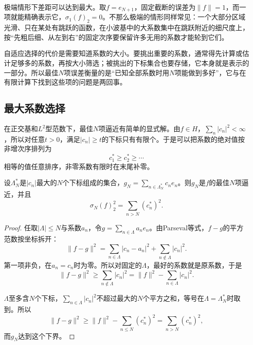 极端情形下差距可以达到最大。取$f=e_{N+1}$，固定截断的误差为$\lVert f\rVert=1$，而一项就能精确表示它，$\sigma_1(f)_2=0$。不那么极端的情形同样常见：一个大部分区域光滑、只在某处有跳跃的函数，在小波基中的大系数集中在跳跃附近的细尺度上，按“先粗后细、从左到右”的固定次序要保留许多无用的系数才能轮到它们。

自适应选择的代价是需要知道系数的大小。要挑出重要的系数，通常得先计算或估计足够多的系数，再按大小筛选；被挑出的下标集合也要存储，它本身就是表示的一部分。所以最佳$N$项误差衡量的是“已知全部系数时用$N$项能做到多好”，它与在有限计算下找到这些项的问题是两回事。

\subsection{最大系数选择}
\label{sec:fapprox-largest-coefficients}

在正交基和$L^2$型范数下，最佳$N$项逼近有简单的显式解。由$f\in H$，$\sum_n\lvert c_n\rvert^2<\infty$，所以对任意$t>0$，满足$\lvert c_n\rvert\geq t$的下标只有有限个。于是可以把系数的绝对值按非增次序排列为
\[
 c_1^*\geq c_2^*\geq\cdots
\]
相等的值任意排序，非零系数有限时在末尾补零。

\begin{theorem}[保留最大系数最优]
\label{thm:fapprox-largest-coefficients}
设$\Lambda_N^*$是$\lvert c_n\rvert$最大的$N$个下标组成的集合，$g_N=\sum_{n\in\Lambda_N^*}c_ne_n$。则$g_N$是$f$的最佳$N$项逼近，并且
\begin{equation}
 \sigma_N(f)_2^2=\sum_{n>N}(c_n^*)^2 .
 \label{eq:fapprox-largest-coefficients}
\end{equation}
\end{theorem}

\begin{proof}
任取$\lvert\Lambda\rvert\leq N$与系数$a_n$，令$g=\sum_{n\in\Lambda}a_ne_n$。由Parseval等式，$f-g$的平方范数按坐标拆开：
\[
 \lVert f-g\rVert^2=\sum_{n\in\Lambda}\lvert c_n-a_n\rvert^2+\sum_{n\notin\Lambda}\lvert c_n\rvert^2 .
\]
第一项非负，在$a_n=c_n$时为零。所以对固定的$\Lambda$，最好的系数就是原系数，于是
\[
 \lVert f-g\rVert^2\geq\sum_{n\notin\Lambda}\lvert c_n\rvert^2=\lVert f\rVert^2-\sum_{n\in\Lambda}\lvert c_n\rvert^2 .
\]

$\Lambda$至多含$N$个下标，$\sum_{n\in\Lambda}\lvert c_n\rvert^2$不超过最大的$N$个平方之和，等号在$\Lambda=\Lambda_N^*$时取到。所以
\[
 \lVert f-g\rVert^2\geq\lVert f\rVert^2-\sum_{n\leq N}(c_n^*)^2=\sum_{n>N}(c_n^*)^2 ,
\]
而$g_N$达到这个下界。
\end{proof}

